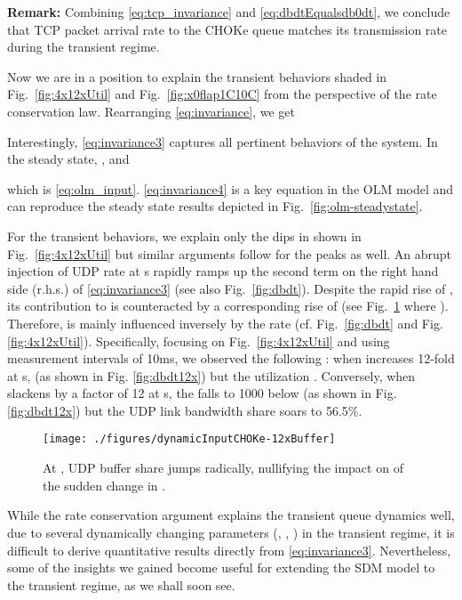 \documentclass{IEEEtran}
\begin{document}
    {\bf Remark:} Combining  \eqref{eq:tcp_invariance} and \eqref{eq:dbdtEqualsdb0dt}, we conclude that TCP packet arrival rate to the CHOKe queue matches its transmission rate during the transient regime.

    Now we are in a position to explain the transient behaviors shaded in Fig.~\ref{fig:4x12xUtil} and Fig.~\ref{fig:x0flap1C10C}  from the perspective of the rate conservation law. Rearranging \eqref{eq:invariance},  we get 

    Interestingly, \eqref{eq:invariance3} captures all pertinent behaviors of the system. In the steady state, , and

        
 which is \eqref{eq:olm_input}. \eqref{eq:invariance4} is a key equation in the OLM  model and can reproduce the steady state results depicted in Fig.~\ref{fig:olm-steadystate}.

For the transient behaviors, we explain only the dips in  shown in Fig.~\ref{fig:4x12xUtil} but similar arguments follow for the peaks as well. An abrupt injection of UDP rate  at s rapidly ramps up the second term on the right hand side (r.h.s.) of \eqref{eq:invariance3} (see also Fig.~\ref{fig:dbdt}). Despite the rapid rise of , its contribution to  is counteracted by a corresponding rise of  (see Fig.~\ref{fig:12BufferChange} where ). Therefore,  is mainly  influenced inversely by the rate  (cf. Fig.~\ref{fig:dbdt} and Fig. \ref{fig:4x12xUtil}). Specifically, focusing on Fig.~\ref{fig:4x12xUtil}  and using measurement intervals of 10ms, we observed the following : when  increases 12-fold at s,  (as shown in Fig. \ref{fig:dbdt12x}) but the utilization . Conversely, when  slackens by a factor of 12 at s, the  falls to 1000 below  (as shown in Fig. \ref{fig:dbdt12x}) but the UDP link bandwidth share soars to 56.5\%.

            \begin{figure}[tbh!]
            \centering
            \texttt{[image: ./figures/dynamicInputCHOKe-12xBuffer]}\caption{At , UDP buffer share  jumps radically, nullifying the impact on  of the sudden change in  .}
            \label{fig:12BufferChange}
    \end{figure}

While the rate conservation argument explains the transient queue dynamics well, due to several dynamically changing parameters (, , ) in the transient regime, it is difficult to derive quantitative  results directly from \eqref{eq:invariance3}. Nevertheless, some of the insights we gained become useful for extending the SDM model to the transient regime, as we shall soon see.
\end{document}
